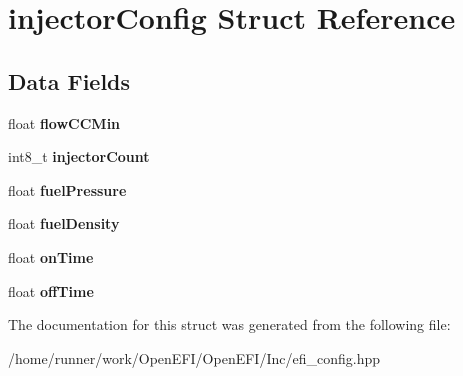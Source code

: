\hypertarget{structinjectorConfig}{}\section{injector\+Config Struct Reference}
\label{structinjectorConfig}
\subsection*{Data Fields}
\begin{DoxyCompactItemize}
\item 
\mbox{\label{structinjectorConfig_ad3c52d7e7374ea75ec9bd84f5704d3b5}} 
float {\bfseries flow\+C\+C\+Min}
\item 
\mbox{\label{structinjectorConfig_a884d3a40bc0a383abc3efae5114ea43d}} 
int8\+\_\+t {\bfseries injector\+Count}
\item 
\mbox{\label{structinjectorConfig_a2f5e75bdae88fc2a399eb0c6189616a5}} 
float {\bfseries fuel\+Pressure}
\item 
\mbox{\label{structinjectorConfig_a9174e55071930eea36eb63077f921ad9}} 
float {\bfseries fuel\+Density}
\item 
\mbox{\label{structinjectorConfig_ab1b437f8aa73f6549d01818c7313eae0}} 
float {\bfseries on\+Time}
\item 
\mbox{\label{structinjectorConfig_acb347ef12480785c86112880d40febd0}} 
float {\bfseries off\+Time}
\end{DoxyCompactItemize}


The documentation for this struct was generated from the following file\+:\begin{DoxyCompactItemize}
\item 
/home/runner/work/\+Open\+E\+F\+I/\+Open\+E\+F\+I/\+Inc/efi\+\_\+config.\+hpp\end{DoxyCompactItemize}
